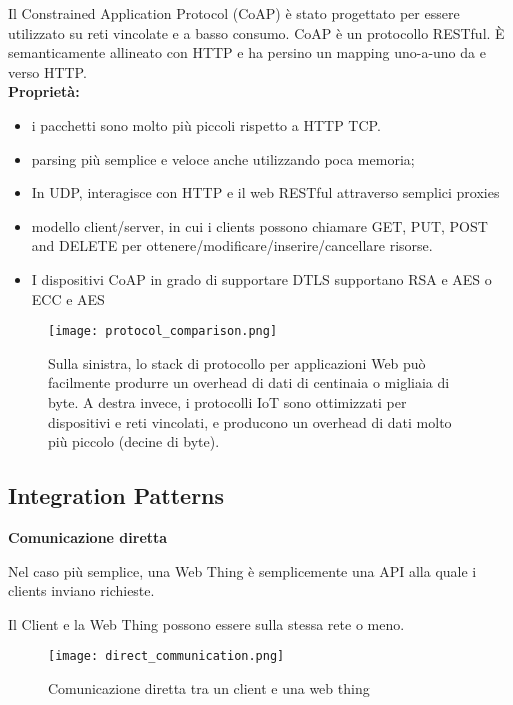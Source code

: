 Il Constrained Application Protocol (CoAP) è stato progettato per essere
utilizzato su reti vincolate e a basso consumo. CoAP è un protocollo RESTful.
È semanticamente allineato con HTTP e ha persino un mapping uno-a-uno da e
verso HTTP.\\

\textbf{Proprietà:}

\begin{itemize}
  \item i pacchetti sono molto più piccoli rispetto a HTTP TCP.
  \item parsing più semplice e veloce anche utilizzando poca memoria;
  \item In UDP, interagisce con HTTP e il web RESTful attraverso semplici
proxies
  \item modello client/server, in cui i clients possono chiamare GET, PUT,
POST and DELETE per ottenere/modificare/inserire/cancellare risorse.
  \item I dispositivi CoAP in grado di supportare DTLS supportano RSA e AES o
ECC e AES
\end{itemize}

\begin{figure}[H]
  \centering
  \texttt{[image: protocol\_comparison.png]}
  \caption{Sulla sinistra, lo stack di protocollo per applicazioni Web può
facilmente produrre un overhead di dati di centinaia o migliaia di byte.
A destra invece, i protocolli IoT sono ottimizzati per dispositivi e reti
vincolati, e producono un overhead di dati molto più piccolo (decine di
byte).}
  \label{fig:protocol_comparison}
\end{figure}

\subsection{Integration Patterns}

\textbf{Comunicazione diretta}

Nel caso più semplice, una Web Thing è semplicemente una API alla quale i
clients inviano richieste.

Il Client e la Web Thing possono essere sulla stessa rete o meno.

\begin{figure}[H]
  \centering
  \texttt{[image: direct\_communication.png]}
  \caption{Comunicazione diretta tra un client e una web thing}
  \label{fig:direct_communication}
\end{figure}

